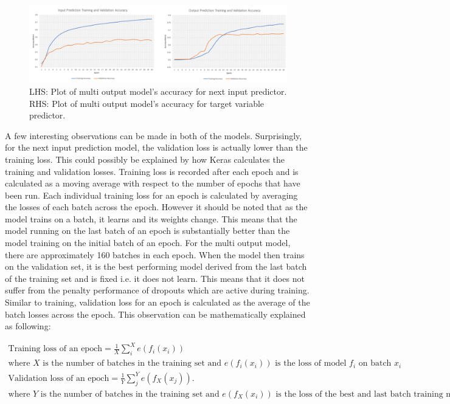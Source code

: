 \documentclass[10pt,onecolumn,letterpaper]{article}
\begin{document}
\begin{figure}[!hbt!]
\centering
\includegraphics[width=\columnwidth]{accuracy_plots.png}
\caption{LHS: Plot of multi output model's accuracy for next input predictor. RHS: Plot of multi output model's accuracy for target variable predictor.}
\label{accuracy_plots}
\end{figure}

A few interesting observations can be made in both of the models. Surprisingly, for the next input prediction model, the validation loss is actually lower than the training loss. This could possibly be explained by how Keras calculates the training and validation losses. Training loss is recorded after each epoch and is calculated as a moving average with respect to the number of epochs that have been run. Each individual training loss for an epoch is calculated by averaging the losses of each batch across the epoch. However it should be noted that as the model trains on a batch, it learns and its weights change. This means that the model running on the last batch of an epoch is substantially better than the model training on the initial batch of an epoch. For the multi output model, there are approximately 160 batches in each epoch. When the model then trains on the validation set, it is the best performing model derived from the last batch of the training set and is fixed i.e. it does not learn. This means that it does not suffer from the penalty performance of dropouts which are active during training. Similar to training, validation loss for an epoch is calculated as the average of the batch losses across the epoch. This observation can be mathematically explained as following:

\vskip -0.5cm
\begin{gather*}
 	\text{Training loss of an epoch} = \frac{1}{X} \sum^{X}_{i}e(f_{i}(x_{i}))  \\
	\text{where $X$ is the number of batches in the training set and $e(f_{i}(x_{i}))$ is the loss of model $f_{i}$ on batch $x_{i}$ } \\
	\text{Validation loss of an epoch} = \frac{1}{Y} \sum^{Y}_{j}e(f_{X}(x_{j})).  \\
	\text{where $Y$ is the number of batches in the training set and $e(f_{X}(x_{i}))$ is the loss of the best and last batch training model $f_{X}$ on batch $x_{j}.$}
\end{gather*}
\end{document}
